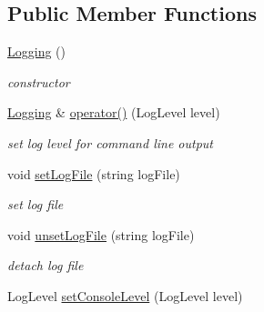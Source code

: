 \subsection*{Public Member Functions}
\begin{DoxyCompactItemize}
\item 
\hypertarget{classnatrium_1_1Logging_a255455c6e8a6c109a8e7e905bdd57ea3}{\hyperlink{classnatrium_1_1Logging_a255455c6e8a6c109a8e7e905bdd57ea3}{Logging} ()}\label{classnatrium_1_1Logging_a255455c6e8a6c109a8e7e905bdd57ea3}

\begin{DoxyCompactList}\small\item\em constructor \end{DoxyCompactList}\item 
\hypertarget{classnatrium_1_1Logging_a2bfeafec90e8b3fdceddc2866fda6e3d}{\hyperlink{classnatrium_1_1Logging}{Logging} \& \hyperlink{classnatrium_1_1Logging_a2bfeafec90e8b3fdceddc2866fda6e3d}{operator()} (Log\-Level level)}\label{classnatrium_1_1Logging_a2bfeafec90e8b3fdceddc2866fda6e3d}

\begin{DoxyCompactList}\small\item\em set log level for command line output \end{DoxyCompactList}\item 
\hypertarget{classnatrium_1_1Logging_a6dc3bdfa386b24a031578f9293a24403}{void \hyperlink{classnatrium_1_1Logging_a6dc3bdfa386b24a031578f9293a24403}{set\-Log\-File} (string log\-File)}\label{classnatrium_1_1Logging_a6dc3bdfa386b24a031578f9293a24403}

\begin{DoxyCompactList}\small\item\em set log file \end{DoxyCompactList}\item 
\hypertarget{classnatrium_1_1Logging_aae32db6189a7c963323a869821bb26d9}{void \hyperlink{classnatrium_1_1Logging_aae32db6189a7c963323a869821bb26d9}{unset\-Log\-File} (string log\-File)}\label{classnatrium_1_1Logging_aae32db6189a7c963323a869821bb26d9}

\begin{DoxyCompactList}\small\item\em detach log file \end{DoxyCompactList}\item 
\hypertarget{classnatrium_1_1Logging_a1bfdfbdfdf8a69e9aa9d6ffa78cb3d45}{Log\-Level \hyperlink{classnatrium_1_1Logging_a1bfdfbdfdf8a69e9aa9d6ffa78cb3d45}{set\-Console\-Level} (Log\-Level level)}\label{classnatrium_1_1Logging_a1bfdfbdfdf8a69e9aa9d6ffa78cb3d45}


\end{DoxyCompactItemize}
